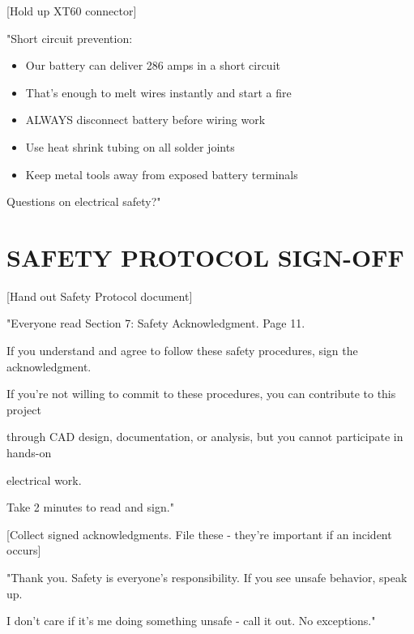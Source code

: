 \documentclass[11pt,letterpaper]{article}
\begin{document}
{[Hold up XT60 connector]\par

"Short circuit prevention:\par

\begin{itemize}
  \item Our battery can deliver 286 amps in a short circuit
  \item That's enough to melt wires instantly and start a fire
  \item ALWAYS disconnect battery before wiring work
  \item Use heat shrink tubing on all solder joints
  \item Keep metal tools away from exposed battery terminals
\end{itemize}

Questions on electrical safety?"\par

\section{SAFETY PROTOCOL SIGN-OFF}

[Hand out Safety Protocol document]\par

"Everyone read Section 7: Safety Acknowledgment. Page 11.\par

If you understand and agree to follow these safety procedures, sign the acknowledgment.\par

If you're not willing to commit to these procedures, you can contribute to this project\par

through CAD design, documentation, or analysis, but you cannot participate in hands-on\par

electrical work.\par

Take 2 minutes to read and sign."\par

[Collect signed acknowledgments. File these - they're important if an incident occurs]\par

"Thank you. Safety is everyone's responsibility. If you see unsafe behavior, speak up.\par

I don't care if it's me doing something unsafe - call it out. No exceptions."\par

}
\end{document}
